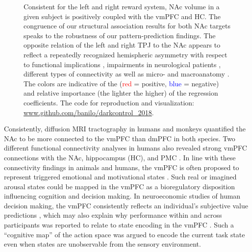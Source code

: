 \documentclass[10pt,letterpaper]{article}
\begin{document}
\begin{figure}[!htbp]
\begin{minipage}[c]{0.45\textwidth}
{      Consistent for the left and right reward system, NAc volume in a given subject is
      positively coupled with the vmPFC and HC. The congruence of our structural association results for both NAc targets speaks to the robustness of our pattern-prediction findings. The opposite relation of the left and right TPJ to the NAc appears to reflect a repeatedly recognized hemispheric asymmetry with respect to functional implications \citep{seghier2013angular}, impairments in neurological patients \citep{corbetta2000}, different types of connectivity \citep{uddin_tpj, caspers2011} as well as micro- and macroanatomy \citep{caspers2006, caspers2008}. The colors are indicative of the (\textcolor{red}{red} = positive,
      \textcolor{blue}{blue} = negative) and relative importance (the lighter the higher) of the regression coefficients.
  The code for reproduction and visualization:
  \url{www.github.com/banilo/darkcontrol_2018}.
  }
  \label{fig:dmn}
\end{minipage}
\end{figure}

Consistently, diffusion MRI tractography in humans and monkeys
\citep{croxson2005quantitative}
quantified the NAc to
be more connected to the vmPFC than dmPFC in both species.
Two different functional connectivity analyses in humans also revealed
strong vmPFC connections
with the NAc, hippocampus (HC),
and PMC \citep{bzdok2015subspecialization}.
%
In line with these connectivity findings in animals and humans,
the vmPFC is often proposed to represent triggered
emotional and motivational states \citep{damasio1996somatic}.
Such real or imagined arousal states could be mapped in the vmPFC
as a bioregulatory disposition influencing cognition
and decision making.
In neuroeconomic studies of human decision making,
the vmPFC consistently reflects an individual’s subjective
value predictions
\citep{behrens2008associative},
which may also explain why performance within and across participants
was reported to relate to state encoding in the vmPFC \citep{Schuck2016}.
Such a ``cognitive map'' of the action space was argued to encode
the current task state even when states are unobservable from
the sensory environment.
\end{document}
